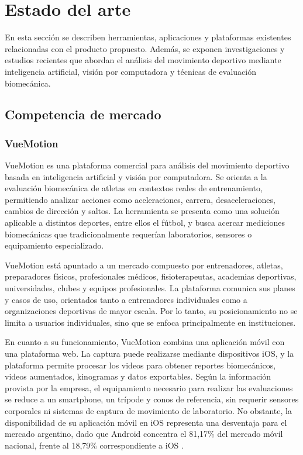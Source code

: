 \chapter{Estado del arte}\label{estado_del_arte}

En esta sección se describen herramientas, aplicaciones y plataformas existentes relacionadas
con el producto propuesto. Además, se exponen investigaciones y estudios recientes que abordan
el análisis del movimiento deportivo mediante inteligencia artificial, visión por computadora
y técnicas de evaluación biomecánica.

\section{Competencia de mercado}

\subsection{VueMotion}

VueMotion \parencite{VueMotionSitio} es una plataforma comercial para análisis del movimiento
deportivo basada en inteligencia artificial y visión por computadora. Se orienta a la
evaluación biomecánica de atletas en contextos reales de entrenamiento, permitiendo analizar
acciones como aceleraciones, carrera, desaceleraciones, cambios de dirección y saltos. La
herramienta se presenta como una solución aplicable a distintos deportes, entre ellos el
fútbol, y busca acercar mediciones biomecánicas que tradicionalmente requerían laboratorios,
sensores o equipamiento especializado.

VueMotion está apuntado a un mercado compuesto por entrenadores, atletas, preparadores
físicos, profesionales médicos, fisioterapeutas, academias deportivas, universidades, clubes
y equipos profesionales. La plataforma comunica sus planes y casos de uso, orientados tanto
a entrenadores individuales como a organizaciones deportivas de mayor escala. Por lo tanto,
su posicionamiento no se limita a usuarios individuales, sino que se enfoca principalmente en
instituciones.

En cuanto a su funcionamiento, VueMotion combina una aplicación móvil con una plataforma web.
La captura puede realizarse mediante dispositivos iOS, y la plataforma permite procesar los
videos para obtener reportes biomecánicos, videos aumentados, kinogramas y datos exportables.
Según la información provista por la empresa, el equipamiento necesario para realizar las
evaluaciones se reduce a un smartphone, un trípode y conos de referencia, sin requerir
sensores corporales ni sistemas de captura de movimiento de laboratorio. No obstante, la
disponibilidad de su aplicación móvil en iOS representa una desventaja para el mercado
argentino, dado que Android concentra el 81,17\% del mercado móvil nacional, frente al
18,79\% correspondiente a iOS \parencite{VueMotionSitio,StatCounterMobileOSArgentina}.

